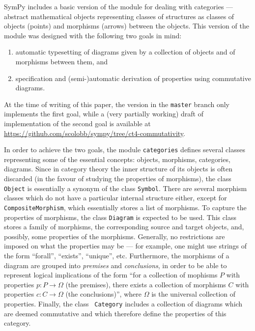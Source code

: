 SymPy includes a basic version of the module for dealing with
categories — abstract mathematical objects representing classes of
structures as classes of objects (points) and morphisms (arrows)
between the objects.  This version of the module was designed with the
following two goals in mind:

\begin{enumerate}
\item automatic typesetting of diagrams given by a collection of
  objects and of morphisms between them, and
\item specification and (semi-)automatic derivation of properties
  using commutative diagrams.
\end{enumerate}

At the time of writing of this paper, the version in the {\tt master}
branch only implements the first goal, while a (very partially
working) draft of implementation of the second goal is available at
\url{https://github.com/scolobb/sympy/tree/ct4-commutativity}.

In order to achieve the two goals, the module {\tt categories} defines
several classes representing some of the essential concepts: objects,
morphisms, categories, diagrams.  Since in category theory the inner
structure of its objects is often discarded (in the favour of studying
the properties of morphisms), the class {\tt Object} is essentially a
synonym of the class {\tt Symbol}.  There are several morphism classes
which do not have a particular internal structure either, except for
{\tt CompositeMorphism}, which essentially stores a list of morphisms.
To capture the properties of morphisms, the class {\tt Diagram} is
expected to be used.  This class stores a family of morphisms, the
corresponding source and target objects, and, possibly, some
properties of the morphisms.  Generally, no restrictions are imposed
on what the properties may be --- for example, one might use strings
of the form ``forall'', ``exists'', ``unique'', etc.  Furthermore, the
morphisms of a diagram are grouped into {\em premises} and {\em
  conclusions}, in order to be able to represent logical implications
of the form ``for a collection of mophisms $P$ with properties $p:P\to
\Omega$ (the premises), there exists a collection of morphisms $C$
with properties $c:C\to \Omega$ (the conclusions)'', where $\Omega$ is
the universal collection of properties.  Finally, the class {\tt
  Category} includes a collection of diagrams which are deemed
commutative and which therefore define the properties of this
category.

